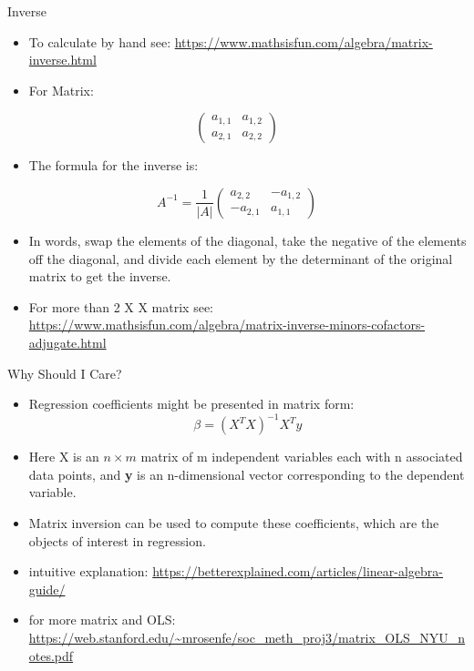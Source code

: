 \documentclass[
  ignorenonframetext,
]{beamer}
\providecommand{\tightlist}{%
  \setlength{\itemsep}{0pt}\setlength{\parskip}{0pt}}
\begin{document}
\begin{frame}{Inverse}
\protect\hypertarget{inverse-1}{}

\begin{itemize}
\item
  To calculate by hand see:
  \url{https://www.mathsisfun.com/algebra/matrix-inverse.html}
\item
  For Matrix:
\end{itemize}

\[\begin{pmatrix}
  a_{1,1} & a_{1,2}  \\
  a_{2,1} & a_{2,2}
\end{pmatrix}\]

\begin{itemize}
\tightlist
\item
  The formula for the inverse is:
\end{itemize}

\[ A^{-1}=\frac{1}{|A|}\begin{pmatrix}
  a_{2,2} & -a_{1,2}  \\
 -a_{2,1} & a_{1,1}
\end{pmatrix}\]

\begin{itemize}
\item
  In words, swap the elements of the diagonal, take the negative of the
  elements off the diagonal, and divide each element by the determinant
  of the original matrix to get the inverse.
\item
  For more than 2 X X matrix see:
  \url{https://www.mathsisfun.com/algebra/matrix-inverse-minors-cofactors-adjugate.html}
\end{itemize}

\end{frame}

\begin{frame}{Why Should I Care?}
\protect\hypertarget{why-should-i-care}{}

\begin{itemize}
\item
  Regression coefficients might be presented in matrix form:
  \[\beta = (X^{T} X)^{−1}X^{T} y\]
\item
  Here X is an \(n × m\) matrix of m independent variables each with n
  associated data points, and \textbf{y} is an n-dimensional vector
  corresponding to the dependent variable.
\item
  Matrix inversion can be used to compute these coefficients, which are
  the objects of interest in regression.
\item
  intuitive explanation:
  \url{https://betterexplained.com/articles/linear-algebra-guide/}
\item
  for more matrix and OLS:
  \url{https://web.stanford.edu/~mrosenfe/soc_meth_proj3/matrix_OLS_NYU_notes.pdf}
\end{itemize}

\end{frame}
\end{document}
